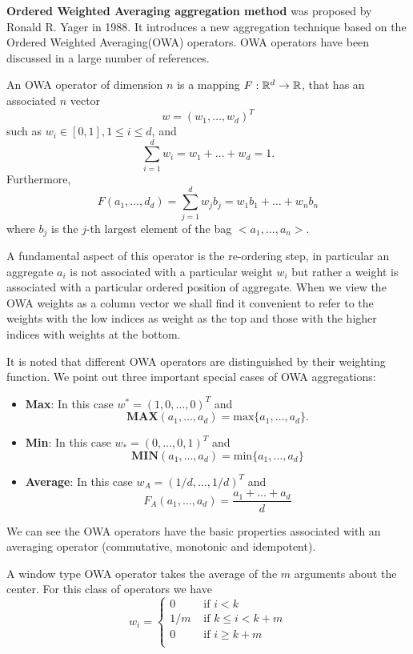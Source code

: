 \vspace{3ex}
\textbf{Ordered Weighted Averaging aggregation method} was proposed by Ronald R. Yager\cite{yager1988ordered} in 1988. It introduces a new aggregation technique based on the Ordered Weighted Averaging(OWA) operators. OWA operators have been discussed in a large number of references. 

\begin{dfn}
An OWA operator of dimension $n$ is a mapping $F: \mathbb{R}^d\rightarrow \mathbb{R}$, that has an associated $n$ vector
\[w = (w_1,\dots, w_d)^T\]
such as $w_i\in[0,1], 1\leqslant i\leqslant d$, and 
\[\sum_{i=1}^d w_i = w_1+\dots+w_d = 1.\]
Furthermore, 
\[F(a_1,\dots,d_d) = \sum_{j=1}^d w_jb_j = w_1b_1 + \dots + w_nb_n\]
where $b_j$ is the $j$-th largest element of the bag $<a_1,\dots,a_n>$.
\end{dfn}

A fundamental aspect of this operator is the re-ordering step, in particular an aggregate $a_i$ is not associated with a particular weight $w_i$ but rather a weight is associated with a particular ordered position of aggregate. When we view the OWA weights as a column vector we shall find it convenient to refer to the weights with the low indices as weight as the top and those with the higher indices with weights at the bottom.

It is noted that different OWA operators are distinguished by their weighting function. We point out three important special cases of OWA aggregations:
\begin{itemize}
\item		\textbf{Max}: In this case $w^{\ast} = (1,0,\dots,0)^T$ and 
\[\textbf{MAX}(a_1,\dots,a_d) = \text{max}\{a_1,\dots,a_d\}.\]
\item		\textbf{Min}: In this case $w_{\ast} = (0,\dots,0,1)^T$ and 
\[\textbf{MIN}(a_1,\dots,a_d) = \text{min}\{a_1,\dots,a_d\}\]
\item		\textbf{Average}: In this case $w_A = (1/d,\dots,1/d)^T$ and 
\[F_A(a_1,\dots,a_d) = \frac{a_1+\dots+a_d}{d}\]
\end{itemize}

We can see the OWA operators have the basic properties associated with an averaging operator (commutative, monotonic and idempotent).

A window type OWA operator takes the average of the $m$ arguments about the center. For this class of operators we have 
\[w_i = \left\{
\begin{matrix} 0 & \text{   if  } i<k \\
1/m & \text{   if  } k\leqslant i <k+m \\
0 & \text{   if  } i\geqslant k+m \\
\end{matrix}\right.
\]

